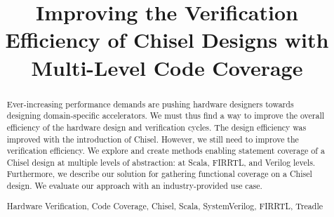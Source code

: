 \documentclass[conference]{IEEEtran}
\begin{document}
%
\title{Improving the Verification Efficiency of Chisel Designs with Multi-Level Code Coverage}
\author{
}
%
%
%

%
%
\maketitle              %
%
\begin{abstract}
Ever-increasing performance demands are pushing hardware designers towards designing domain-specific accelerators. We must thus find a way to improve the overall efficiency of the hardware design and verification cycles. The design efficiency was improved with the introduction of Chisel. However, we still need to improve the verification efficiency.
We explore and create methods enabling statement coverage of a Chisel design at multiple levels of abstraction: at Scala, FIRRTL, and Verilog levels. Furthermore, we describe our solution for gathering functional coverage on a Chisel design.
We evaluate our approach with an industry-provided use case.

\begin{IEEEkeywords}
Hardware Verification, Code Coverage, Chisel, Scala, SystemVerilog, FIRRTL, Treadle
\end{IEEEkeywords}

\end{abstract}
\end{document}
